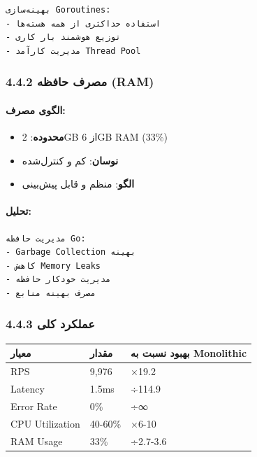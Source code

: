 \documentclass[
]{article}
\newcounter{none} %
\providecommand{\tightlist}{%
  \setlength{\itemsep}{0pt}\setlength{\parskip}{0pt}}
\begin{document}
\begin{verbatim}
بهینه‌سازی Goroutines:
- استفاده حداکثری از همه هسته‌ها
- توزیع هوشمند بار کاری
- مدیریت کارآمد Thread Pool
\end{verbatim}

\subsubsection{4.4.2 مصرف حافظه
(RAM)}\label{ux645ux635ux631ux641-ux62dux627ux641ux638ux647-ram-2}

\paragraph{الگوی
مصرف:}\label{ux627ux644ux6afux648ux6cc-ux645ux635ux631ux641-2}

\begin{itemize}
\tightlist
\item
  \textbf{محدوده}: 2GB از 6GB RAM (33\%)
\item
  \textbf{نوسان}: کم و کنترل‌شده
\item
  \textbf{الگو}: منظم و قابل پیش‌بینی
\end{itemize}

\paragraph{تحلیل:}\label{ux62aux62dux644ux6ccux644-5}

\begin{verbatim}
مدیریت حافظه Go:
- Garbage Collection بهینه
- کاهش Memory Leaks
- مدیریت خودکار حافظه
- مصرف بهینه منابع
\end{verbatim}

\subsubsection{4.4.3 عملکرد
کلی}\label{ux639ux645ux644ux6a9ux631ux62f-ux6a9ux644ux6cc-2}

{\def\LTcaptype{none} %
\begin{longtable}[]{@{}lll@{}}
\toprule\noalign{}
معیار & مقدار & بهبود نسبت به Monolithic \\
\midrule\noalign{}
\endhead
\bottomrule\noalign{}
\endlastfoot
RPS & 9,976 & ×19.2 \\
Latency & 1.5ms & ÷114.9 \\
Error Rate & 0\% & ÷∞ \\
CPU Utilization & 40-60\% & ×6-10 \\
RAM Usage & 33\% & ÷2.7-3.6 \\
\end{longtable}
}
\end{document}
